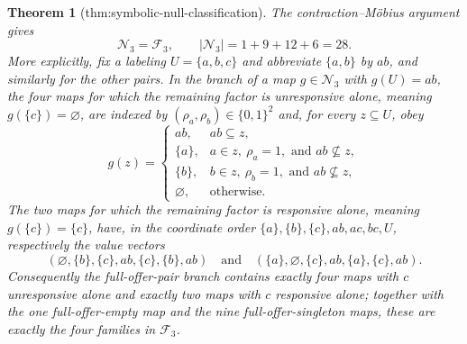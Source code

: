 \documentclass{article}
\newtheorem{theorem}{Theorem}
\begin{document}
\begin{theorem}[thm:symbolic-null-classification]\label{thm:symbolic-null-classification}
The contraction--Möbius argument gives
\[
\mathcal N_3=\mathcal F_3,
\qquad
|\mathcal N_3|=1+9+12+6=28.
\]
More explicitly, fix a labeling \(U=\{a,b,c\}\) and abbreviate
\(\{a,b\}\) by \(ab\), and similarly for the other pairs.  In the
branch of a map \(g\in\mathcal N_3\) with \(g(U)=ab\), the four maps for which the remaining factor is
unresponsive alone, meaning \(g(\{c\})=\varnothing\), are indexed by
\((\rho_a,\rho_b)\in\{0,1\}^2\) and, for every \(z\subseteq U\), obey
\[
g(z)=
\begin{cases}
ab,&ab\subseteq z,\\
\{a\},&a\in z,\ \rho_a=1,\text{ and }ab\nsubseteq z,\\
\{b\},&b\in z,\ \rho_b=1,\text{ and }ab\nsubseteq z,\\
\varnothing,&\text{otherwise}.
\end{cases}
\]
The two maps for which the remaining factor is responsive alone,
meaning \(g(\{c\})=\{c\}\), have, in the coordinate order
\(\{a\},\{b\},\{c\},ab,ac,bc,U\), respectively the value vectors
\[
(\varnothing,\{b\},\{c\},ab,\{c\},\{b\},ab)
\quad\text{and}\quad
(\{a\},\varnothing,\{c\},ab,\{a\},\{c\},ab).
\]
Consequently the full-offer-pair branch contains exactly four maps
with \(c\) unresponsive alone and exactly two maps with \(c\)
responsive alone; together with the one full-offer-empty map and the
nine full-offer-singleton maps, these are exactly the four families in
\(\mathcal F_3\).
\end{theorem}
\end{document}
